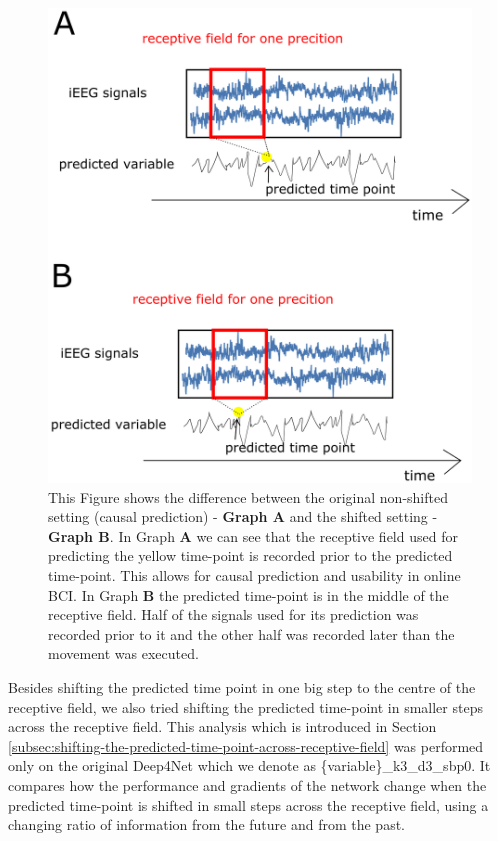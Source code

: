 \begin{figure}[!htbp]
\centering
   \includegraphics[width=0.8\linewidth]{img/ch4/shifted-vs-non-shifted-image.png}
   \caption[Shifted vs. non-shifted setting - scheme]{This Figure shows the difference between the original non-shifted setting (causal prediction) - \textbf{Graph A} and the shifted setting - \textbf{Graph B}. In Graph \textbf{A} we can see that the receptive field used for predicting the yellow time-point is recorded prior to the predicted time-point. This allows for causal prediction and usability in online BCI. In Graph \textbf{B} the predicted time-point is in the middle of the receptive field. Half of the signals used for its prediction was recorded prior to it and the other half was recorded later than the movement was executed.}
   \label{fig:image-of-shifting}
\end{figure}
\clearpage
Besides shifting the predicted time point in one big step to the centre of the receptive field, we also tried shifting the predicted time-point in smaller steps across the receptive field.
This analysis which is introduced in Section \ref{subsec:shifting-the-predicted-time-point-across-receptive-field} was performed only on the original Deep4Net which we denote as \{variable\}\_k3\_d3\_sbp0.
It compares how the performance and gradients of the network change when the predicted time-point is shifted in small steps across the receptive field, using a changing ratio of information from the future and from the past.

